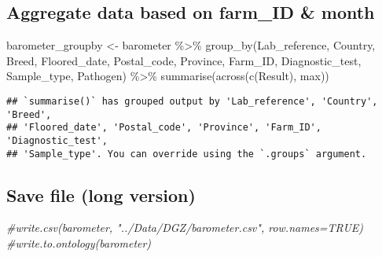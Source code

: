 \documentclass[
]{article}
\newenvironment{Shaded}{\begin{snugshade}}{\end{snugshade}}
\newcommand{\CommentTok}[1]{\textcolor[rgb]{0.56,0.35,0.01}{\textit{#1}}}
\newcommand{\FunctionTok}[1]{\textcolor[rgb]{0.00,0.00,0.00}{#1}}
\newcommand{\NormalTok}[1]{#1}
\newcommand{\OtherTok}[1]{\textcolor[rgb]{0.56,0.35,0.01}{#1}}
\newcommand{\SpecialCharTok}[1]{\textcolor[rgb]{0.00,0.00,0.00}{#1}}
\newcommand{\StringTok}[1]{\textcolor[rgb]{0.31,0.60,0.02}{#1}}
\begin{document}
\begin{Shaded}
\end{Shaded}

\hypertarget{aggregate-data-based-on-farm_id-month}{%
\subsection{Aggregate data based on farm\_ID \&
month}\label{aggregate-data-based-on-farm_id-month}}

\begin{Shaded}
\begin{Highlighting}[]
\NormalTok{barometer\_groupby }\OtherTok{\textless{}{-}}\NormalTok{ barometer }\SpecialCharTok{\%\textgreater{}\%}
  \FunctionTok{group\_by}\NormalTok{(Lab\_reference, Country, Breed, Floored\_date, Postal\_code, Province,}
\NormalTok{           Farm\_ID, Diagnostic\_test, Sample\_type, Pathogen) }\SpecialCharTok{\%\textgreater{}\%}
  \FunctionTok{summarise}\NormalTok{(}\FunctionTok{across}\NormalTok{(}\FunctionTok{c}\NormalTok{(Result), max))}
\end{Highlighting}
\end{Shaded}

\begin{verbatim}
## `summarise()` has grouped output by 'Lab_reference', 'Country', 'Breed',
## 'Floored_date', 'Postal_code', 'Province', 'Farm_ID', 'Diagnostic_test',
## 'Sample_type'. You can override using the `.groups` argument.
\end{verbatim}

\hypertarget{save-file-long-version}{%
\subsection{Save file (long version)}\label{save-file-long-version}}

\begin{Shaded}
\begin{Highlighting}[]
\CommentTok{\#write.csv(barometer, "../Data/DGZ/barometer.csv", row.names=TRUE)}
\CommentTok{\#write.to.ontology(barometer)}
\end{Highlighting}
\end{Shaded}
\end{document}
